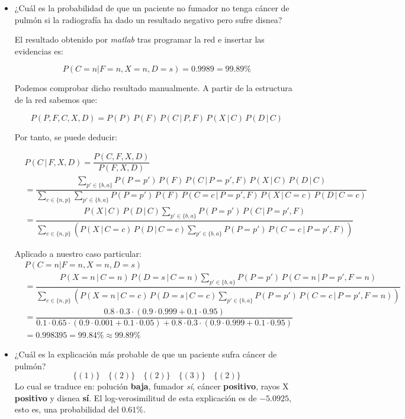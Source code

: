 \documentclass[a4paper]{article}
\begin{document}
\begin{itemize} 
\item ¿Cuál es la probabilidad de que un paciente no fumador no tenga cáncer de pulmón si la radiografía ha dado un resultado negativo pero sufre disnea?

El resultado obtenido por \textit{matlab} tras programar la red e insertar las evidencias es:

\[ P \left( C = n | F = n, X = n, D = s \right) = 0.9989 = 99.89\% \]

Podemos comprobar dicho resultado manualmente. A partir de la estructura de la red sabemos que:

\[ P(P, F, C, X, D) = P(P)\,P(F)\,P(C\,|\,P,F)\,P(X\,|\,C)\,P(D\,|\,C) \]

Por tanto, se puede deducir:

{\small \[ \begin{aligned}
&P(C\,|\,F,X,D) = \dfrac{P(C,F,X,D)}{P(F,X,D)} \\
&=\dfrac{ \sum\limits_{p\prime \in \lbrace b, a \rbrace} P(P=p\prime )\,P(F)\,P(C\,|\,P=p\prime ,F)\,P(X\,|\,C)\,P(D\,|\,C)}{ \sum\limits_{c \in \lbrace n, p \rbrace} \sum\limits_{p\prime \in \lbrace b, a \rbrace} P(P=p\prime )\,P(F)\,P(C=c\,|\,P=p\prime ,F)\,P(X\,|\,C=c)\,P(D\,|\,C=c)} \\
&= \dfrac{ P(X\,|\,C)\,P(D\,|\,C) \sum\limits_{p\prime \in \lbrace b, a \rbrace} P(P=p\prime )\,P(C\,|\,P=p\prime ,F)}{ \sum\limits_{c \in \lbrace n, p \rbrace} \left( P(X\,|\,C=c)\,P(D\,|\,C=c) \sum\limits_{p\prime \in \lbrace b, a \rbrace} P(P=p\prime )\,P(C=c\,|\,P=p\prime ,F) \right) } \end{aligned}  \]}

Aplicado a nuestro caso particular:
{\small \[ \begin{aligned}
&P \left( C = n | F = n, X = n, D = s \right) \\
&=\dfrac{ P(X=n\,|\,C=n)\,P(D=s\,|\,C=n) \sum\limits_{p\prime \in \lbrace b, a \rbrace} P(P=p\prime )\,P(C=n\,|\,P=p\prime ,F=n)}{ \sum\limits_{c \in \lbrace n, p \rbrace} \left( P(X=n\,|\,C=c)\,P(D=s\,|\,C=c) \sum\limits_{p\prime \in \lbrace b, a \rbrace} P(P=p\prime )\,P(C=c\,|\,P=p\prime ,F=n) \right) } \\
&= \dfrac{0.8 \cdot 0.3 \cdot (0.9 \cdot 0.999+0.1 \cdot 0.95)} {0.1 \cdot 0.65 \cdot (0.9 \cdot 0.001 + 0.1 \cdot 0.05) + 0.8 \cdot 0.3 \cdot (0.9 \cdot 0.999+0.1 \cdot 0.95) } \\
&= 0.998395 = 99.84\% \approx 99.89 \% \end{aligned} \]}



\item ¿Cuál es la explicación más probable de que un paciente sufra cáncer de pulmón?
\[ \lbrace \left( 1 \right) \rbrace \quad \lbrace \left( 2 \right) \rbrace \quad \lbrace \left( 2 \right) \rbrace \quad \lbrace \left( 3 \right) \rbrace \quad \lbrace \left( 2 \right) \rbrace \]
Lo cual se traduce en: polución \textbf{baja}, fumador \textit{sí}, cáncer \textbf{positivo}, rayos X \textbf{positivo} y disnea \textbf{sí}. El log-verosimilitud de esta explicación es de $-5.0925$, esto es, una probabilidad del $0.61\%$.
\end{itemize}
\end{document}
